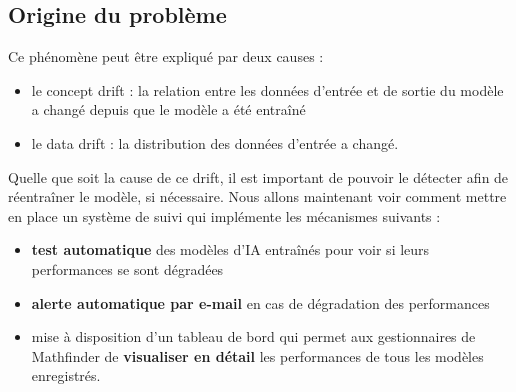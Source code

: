 \documentclass[french]{article}
\begin{document}
    \subsection{Origine du problème}
    Ce phénomène peut être expliqué par deux causes :
    \begin{itemize}
        \item le concept drift : la relation entre les données d'entrée et de sortie du modèle a changé depuis que le modèle a été entraîné
        \item le data drift : la distribution des données d'entrée a changé.
    \end{itemize}
    Quelle que soit la cause de ce drift, il est important de pouvoir le détecter afin de réentraîner le modèle, si nécessaire. Nous allons maintenant voir comment mettre en place un système de suivi qui implémente les mécanismes suivants :
    \begin{itemize}
        \item \textbf{test automatique} des modèles d'IA entraînés pour voir si leurs performances se sont dégradées
        \item \textbf{alerte automatique par e-mail} en cas de dégradation des performances
        \item mise à disposition d'un tableau de bord qui permet aux gestionnaires de Mathfinder de \textbf{visualiser en détail} les performances de tous les modèles enregistrés.
    \end{itemize} 
\end{document}
